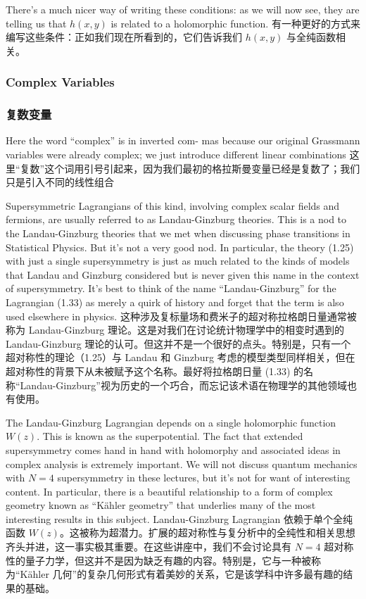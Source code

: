 \documentclass{article}
\begin{document}
\begin{paracol}{2}
There's a much nicer way of writing these conditions: as we will now see, they are telling us that $h(x, y)$ is related to a holomorphic function.
\switchcolumn
有一种更好的方式来编写这些条件：正如我们现在所看到的，它们告诉我们 $h(x, y)$ 与全纯函数相关。
\switchcolumn*

\subsubsection*{Complex Variables}
\switchcolumn
\subsubsection*{复数变量}
\switchcolumn*

Here the word “complex” is in inverted com- mas because our original Grassmann variables were already complex; we just introduce different linear combinations
\switchcolumn
这里“复数”这个词用引号引起来，因为我们最初的格拉斯曼变量已经是复数了；我们只是引入不同的线性组合
\switchcolumn*

Supersymmetric Lagrangians of this kind, involving complex scalar ﬁelds and fermions, are usually referred to as Landau-Ginzburg theories. This is a nod to the Landau-Ginzburg theories that we met when discussing phase transitions in Statistical Physics. But it's not a very good nod. In particular, the theory (1.25) with just a single supersymmetry is just as much related to the kinds of models that Landau and Ginzburg considered but is never given this name in the context of supersymmetry. It's best to think of the name “Landau-Ginzburg” for the Lagrangian (1.33) as merely a quirk of history and forget that the term is also used elsewhere in physics.
\switchcolumn
这种涉及复标量场和费米子的超对称拉格朗日量通常被称为 Landau-Ginzburg 理论。这是对我们在讨论统计物理学中的相变时遇到的 Landau-Ginzburg 理论的认可。但这并不是一个很好的点头。特别是，只有一个超对称性的理论（1.25）与 Landau 和 Ginzburg 考虑的模型类型同样相关，但在超对称性的背景下从未被赋予这个名称。最好将拉格朗日量 (1.33) 的名称“Landau-Ginzburg”视为历史的一个巧合，而忘记该术语在物理学的其他领域也有使用。
\switchcolumn*

The Landau-Ginzburg Lagrangian depends on a single holomorphic function $W (z)$. This is known as the superpotential. The fact that extended supersymmetry comes hand in hand with holomorphy and associated ideas in complex analysis is extremely important. We will not discuss quantum mechanics with $N = 4$ supersymmetry in these lectures, but it's not for want of interesting content. In particular, there is a beautiful relationship to a form of complex geometry known as “Kähler geometry” that underlies many of the most interesting results in this subject.
\switchcolumn
Landau-Ginzburg Lagrangian 依赖于单个全纯函数 $W (z)$。这被称为超潜力。扩展的超对称性与复分析中的全纯性和相关思想齐头并进，这一事实极其重要。在这些讲座中，我们不会讨论具有 $N = 4$ 超对称性的量子力学，但这并不是因为缺乏有趣的内容。特别是，它与一种被称为“Kähler 几何”的复杂几何形式有着美妙的关系，它是该学科中许多最有趣的结果的基础。
\switchcolumn*


\end{paracol}
\end{document}
